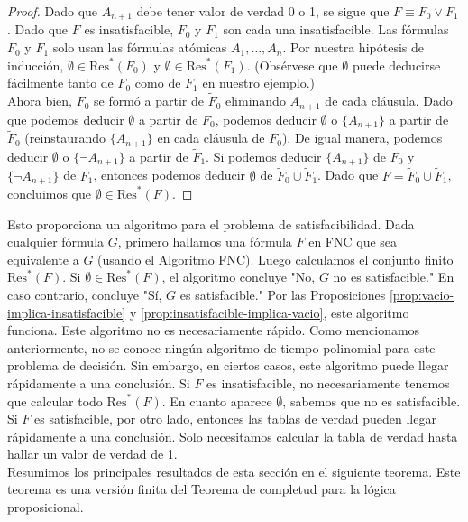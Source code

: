 \documentclass[12pt,a4paper]{book}
\newcommand{\comillas}[1]{"#1"}
\begin{document}
\begin{proof}
        Dado que $A_{n+1}$ debe tener valor de verdad 0 o 1, se sigue que $F\equiv F_{0}\vee F_{1}$. Dado que $F$ es
        insatisfacible, $F_{0}$ y $F_{1}$ son cada una insatisfacible. Las fórmulas $F_{0}$ y $F_{1}$ solo usan las fórmulas
        atómicas $A_{1},\dots,A_{n}$. Por nuestra hipótesis de inducción, $\emptyset\in\mathrm{Res}^{*}(F_{0})$ y
        $\emptyset\in\mathrm{Res}^{*}(F_{1})$. (Obsérvese que $\emptyset$ puede deducirse fácilmente tanto de $F_{0}$ como de
        $F_{1}$ en nuestro ejemplo.)\\
        Ahora bien, $F_{0}$ se formó a partir de $\widetilde{F}_{0}$ eliminando $A_{n+1}$ de cada cláusula. Dado que podemos
        deducir $\emptyset$ a partir de $F_{0}$, podemos deducir $\emptyset$ o $\{A_{n+1}\}$ a partir de $\widetilde{F}_{0}$
        (reinstaurando $\{A_{n+1}\}$ en cada cláusula de $F_{0}$). De igual manera, podemos deducir $\emptyset$ o
        $\{\neg A_{n+1}\}$ a partir de $\widetilde{F}_{1}$. Si podemos deducir $\{A_{n+1}\}$ de $F_{0}$ y $\{\neg A_{n+1}\}$
        de $F_{1}$, entonces podemos deducir $\emptyset$ de $\widetilde{F}_{0}\cup\widetilde{F}_{1}$. Dado que
        $F=\widetilde{F}_{0}\cup\widetilde{F}_{1}$, concluimos que $\emptyset\in\mathrm{Res}^{*}(F)$.
    \end{proof}

    Esto proporciona un algoritmo para el problema de satisfacibilidad. Dada cualquier fórmula $G$, primero hallamos una
    fórmula $F$ en FNC que sea equivalente a $G$ (usando el Algoritmo FNC). Luego calculamos el conjunto finito
    $\mathrm{Res}^{*}(F)$. Si $\emptyset\in\mathrm{Res}^{*}(F)$, el algoritmo concluye \comillas{No, $G$ no es satisfacible.}
    En caso contrario, concluye \comillas{Sí, $G$ es satisfacible.} Por las Proposiciones
    \ref{prop:vacio-implica-insatisfacible} y \ref{prop:insatisfacible-implica-vacio}, este algoritmo funciona. Este
    algoritmo no es necesariamente rápido. Como mencionamos anteriormente, no se conoce ningún algoritmo de tiempo
    polinomial para este problema de decisión. Sin embargo, en ciertos casos, este algoritmo puede llegar rápidamente a una
    conclusión. Si $F$ es insatisfacible, no necesariamente tenemos que calcular todo $\mathrm{Res}^{*}(F)$. En cuanto
    aparece $\emptyset$, sabemos que no es satisfacible. Si $F$ es satisfacible, por otro lado, entonces las tablas de
    verdad pueden llegar rápidamente a una conclusión. Solo necesitamos calcular la tabla de verdad hasta hallar un valor de
    verdad de 1.\\
    Resumimos los principales resultados de esta sección en el siguiente teorema. Este teorema es una versión finita del
    Teorema de completud para la lógica proposicional.
\end{document}
